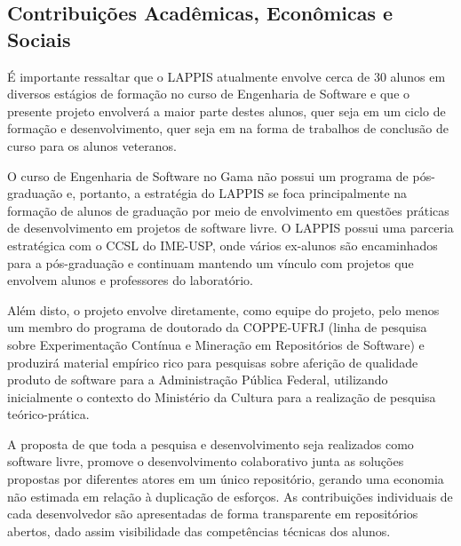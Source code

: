 % 
% 
% 
% 
% 
% 
% 

\subsection{Contribuições Acadêmicas, Econômicas e Sociais}

 É importante ressaltar que o LAPPIS atualmente envolve cerca de 30 alunos em diversos
estágios de formação no curso de Engenharia de Software e que o presente projeto envolverá a maior parte destes alunos, quer seja em um ciclo 
de formação e desenvolvimento, quer seja em na forma de trabalhos de conclusão de curso para os alunos veteranos.

O curso de Engenharia de Software no Gama não possui um programa de pós-graduação e, portanto, a estratégia do LAPPIS se foca principalmente na 
formação de alunos de graduação por meio de envolvimento em questões práticas de desenvolvimento em projetos de software livre. O LAPPIS possui
uma parceria estratégica com o CCSL do IME-USP, onde vários ex-alunos são encaminhados para a pós-graduação e continuam mantendo um vínculo com 
projetos que envolvem alunos e professores do laboratório.

Além disto, o projeto envolve diretamente, como equipe do projeto, pelo menos um membro do programa de doutorado da COPPE-UFRJ
(linha de pesquisa sobre Experimentação Contínua e Mineração em Repositórios de Software) e produzirá material empírico rico para pesquisas
sobre  aferição de qualidade produto de software para a Administração Pública Federal, utilizando inicialmente o contexto do Ministério da
Cultura para a realização de pesquisa teórico-prática.

A proposta de que toda a pesquisa e desenvolvimento seja realizados como software livre, promove o desenvolvimento colaborativo junta as
soluções propostas por diferentes atores em um único repositório, gerando uma economia não estimada em relação à duplicação de esforços.  
As contribuições individuais de cada desenvolvedor são apresentadas de forma transparente em repositórios abertos, dado assim 
visibilidade das competências técnicas dos alunos.

